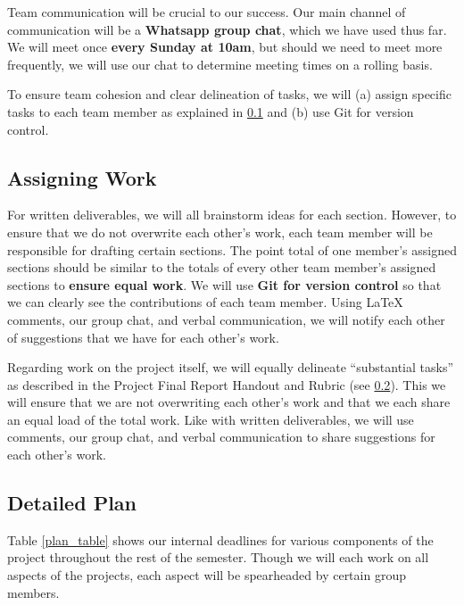 \documentclass{article} %
\begin{document}
Team communication will be crucial to our success. Our main channel of communication will be a \textbf{Whatsapp group chat}, which we have used thus far. We will meet once \textbf{every Sunday at 10am}, but should we need to meet more frequently, we will use our chat to determine meeting times on a rolling basis.

To ensure team cohesion and clear delineation of tasks, we will (a) assign specific tasks to each team member as explained in \ref{assigning_work} and (b) use Git for version control.

\subsection{Assigning Work}
\label{assigning_work}

For written deliverables, we will all brainstorm ideas for each section. However, to ensure that we do not overwrite each other's work, each team member will be responsible for drafting certain sections. The point total of one member's assigned sections should be similar to the totals of every other team member's assigned sections to \textbf{ensure equal work}. We will use \textbf{Git for version control} so that we can clearly see the contributions of each team member. Using LaTeX comments, our group chat, and verbal communication, we will notify each other of suggestions that we have for each other's work.

Regarding work on the project itself, we will equally delineate ``substantial tasks'' as described in the Project Final Report Handout and Rubric (see \ref{detailed_plan}). This we will ensure that we are not overwriting each other's work and that we each share an equal load of the total work. Like with written deliverables, we will use comments, our group chat, and verbal communication to share suggestions for each other's work.

\subsection{Detailed Plan}
\label{detailed_plan}

Table \ref{plan_table} shows our internal deadlines for various components of the project throughout the rest of the semester. Though we will each work on all aspects of the projects, each aspect will be spearheaded by certain group members.
\end{document}
